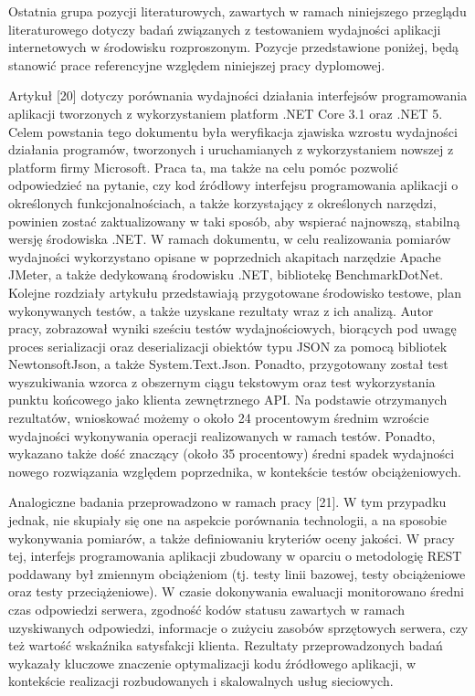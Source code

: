 Ostatnia grupa pozycji literaturowych, zawartych w ramach niniejszego przeglądu literaturowego dotyczy badań związanych z testowaniem wydajności aplikacji internetowych w środowisku rozproszonym. Pozycje przedstawione poniżej, będą stanowić prace referencyjne względem niniejszej pracy dyplomowej.

Artykuł [20] dotyczy porównania wydajności działania interfejsów programowania aplikacji tworzonych z wykorzystaniem platform .NET Core 3.1 oraz .NET 5. Celem powstania tego dokumentu była weryfikacja zjawiska wzrostu wydajności działania programów, tworzonych i uruchamianych z wykorzystaniem nowszej z platform firmy Microsoft. Praca ta, ma także na celu pomóc pozwolić odpowiedzieć na pytanie, czy kod źródłowy interfejsu programowania aplikacji o określonych funkcjonalnościach, a także korzystający z określonych narzędzi, powinien zostać zaktualizowany w taki sposób, aby wspierać najnowszą, stabilną wersję środowiska .NET. W ramach dokumentu, w celu realizowania pomiarów wydajności wykorzystano opisane w poprzednich akapitach narzędzie Apache JMeter, a także dedykowaną środowisku .NET, bibliotekę BenchmarkDotNet. Kolejne rozdziały artykułu przedstawiają przygotowane środowisko testowe, plan wykonywanych testów, a także uzyskane rezultaty wraz z ich analizą. Autor pracy, zobrazował wyniki sześciu testów wydajnościowych, biorących pod uwagę proces serializacji oraz deserializacji obiektów typu JSON za pomocą bibliotek NewtonsoftJson, a także System.Text.Json. Ponadto, przygotowany został test wyszukiwania wzorca z obszernym ciągu tekstowym oraz test wykorzystania punktu końcowego jako klienta zewnętrznego API. Na podstawie otrzymanych rezultatów, wnioskować możemy o około 24 procentowym średnim wzroście wydajności wykonywania operacji realizowanych w ramach testów. Ponadto, wykazano także dość znaczący (około 35 procentowy) średni spadek wydajności nowego rozwiązania względem poprzednika, w kontekście testów obciążeniowych.

Analogiczne badania przeprowadzono w ramach pracy [21]. W tym przypadku jednak, nie skupiały się one na aspekcie porównania technologii, a na sposobie wykonywania pomiarów, a także definiowaniu kryteriów oceny jakości. W pracy tej, interfejs programowania aplikacji zbudowany w oparciu o metodologię REST poddawany był zmiennym obciążeniom (tj. testy linii bazowej, testy obciążeniowe oraz testy przeciążeniowe). W czasie dokonywania ewaluacji monitorowano średni czas odpowiedzi serwera, zgodność kodów statusu zawartych w ramach uzyskiwanych odpowiedzi, informacje o zużyciu zasobów sprzętowych serwera, czy też wartość wskaźnika satysfakcji klienta. Rezultaty przeprowadzonych badań wykazały kluczowe znaczenie optymalizacji kodu źródłowego aplikacji, w kontekście realizacji rozbudowanych i skalowalnych usług sieciowych.